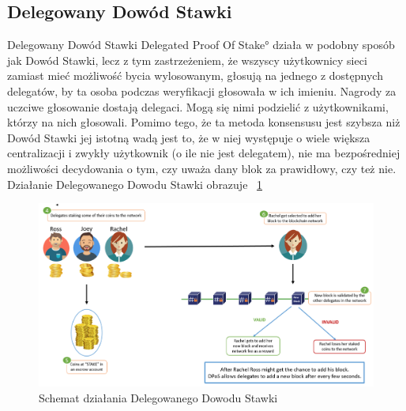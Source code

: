 \subsection{Delegowany Dowód Stawki}
\label{ssec:DPoS}

Delegowany Dowód Stawki \ang{Delegated Proof Of Stake} działa w podobny sposób jak Dowód Stawki, lecz z tym zastrzeżeniem, że wszyscy użytkownicy sieci zamiast mieć możliwość bycia wylosowanym, głosują na jednego z dostępnych delegatów, by ta osoba podczas weryfikacji głosowała w ich imieniu. Nagrody za uczciwe głosowanie dostają delegaci. Mogą się nimi podzielić z użytkownikami, którzy na nich głosowali. Pomimo tego, że ta metoda konsensusu jest szybsza niż Dowód Stawki jej istotną wadą jest to, że w niej występuje o wiele większa centralizacji i zwykły użytkownik (o ile nie jest delegatem), nie ma bezpośredniej możliwości decydowania o tym, czy uważa dany blok za prawidłowy, czy też nie.
Działanie Delegowanego Dowodu Stawki obrazuje \figurename{~\ref{fig:ConsensusDPOS}}
\begin{figure}[ht]
    \centering
    \includegraphics[width=\textwidth]{Images/ConsensusDPOS.png}
    \caption{Schemat działania Delegowanego Dowodu Stawki}
    \label{fig:ConsensusDPOS}
\end{figure}

